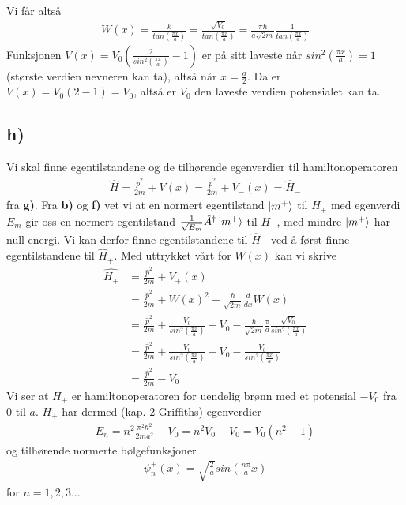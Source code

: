 \documentclass[norsk,a4paper,12pt]{article}
\begin{document}
Vi får altså
\begin{equation}
\begin{aligned}
	W(x) = \frac{k}{tan(\frac{\pi x}{a})} = \frac{\sqrt{V_0}}{tan(\frac{\pi x}{a})} = \frac{\pi\hbar}{a\sqrt{2m}}\frac{1}{tan(\frac{\pi x}{a})}
\end{aligned}
\end{equation}
Funksjonen $V(x) = V_0(\frac{2}{sin^2(\frac{\pi x}{a})} - 1)$ er på sitt laveste når $sin^2(\frac{\pi x}{a}) = 1$ (største verdien nevneren kan ta), altså når $x = \frac{a}{2}$. Da er $V(x) = V_0(2 - 1) = V_0$, altså er $V_0$ den laveste verdien potensialet kan ta.

\subsection*{h)}
Vi skal finne egentilstandene og de tilhørende egenverdier til hamiltonoperatoren
\begin{equation}
\begin{aligned}
	\hat{H} = \frac{\hat{p}^2}{2m} + V(x) = \frac{\hat{p}^2}{2m} + V_-(x) = \hat{H}_-
\end{aligned}
\end{equation}
fra {\bf g)}. Fra {\bf b)} og {\bf f)} vet vi at en normert egentilstand $\ket{m^+}$ til $\hat{H}_+$ med egenverdi $E_m$ gir oss en normert egentilstand $\frac{1}{\sqrt{E_m}}\hat{A}^\dagger \ket{m^+}$ til $H_-$, med mindre $\ket{m^+}$ har null energi. Vi kan derfor finne egentilstandene til $\hat{H}_-$ ved å først finne egentilstandene til $\hat{H}_+$. Med uttrykket vårt for $W(x)$ kan vi skrive
\begin{equation}
\begin{aligned}
	\hat{H_+} &= \frac{\hat p^2}{2m} + V_+(x) \\
	&= \frac{\hat p^2}{2m} + W(x)^2 + \frac{\hbar}{\sqrt{2m}} \frac{d}{d x}W(x) \\
	&= \frac{\hat p^2}{2m} + \frac{V_0}{sin^2(\frac{\pi x}{a})} - V_0 - \frac{\hbar}{\sqrt{2m}}\frac{\pi}{a}\frac{\sqrt{V_0}}{sin^2(\frac{\pi x}{a})} \\
	&= \frac{\hat p^2}{2m} + \frac{V_0}{sin^2(\frac{\pi x}{a})} - V_0 - \frac{V_0}{sin^2(\frac{\pi x}{a})} \\
	&= \frac{\hat p^2}{2m} - V_0
\end{aligned}
\end{equation}
Vi ser at $H_+$ er hamiltonoperatoren for uendelig brønn med et potensial $-V_0$ fra $0$ til $a$. $H_+$ har dermed (kap. 2 Griffiths) egenverdier
\begin{equation}
\begin{aligned}
	E_n = n^2 \frac{\pi^2 \hbar^2}{2ma^2} - V_0 = n^2 V_0 - V_0 = V_0 (n^2 - 1)
\end{aligned}
\end{equation}
og tilhørende normerte bølgefunksjoner
\begin{equation}
\begin{aligned}
	\psi_n^+(x) = \sqrt{\frac{2}{a}} sin(\frac{n \pi}{a} x)
\end{aligned}
\end{equation}
for $n = 1,2,3 \dots$
\end{document}
